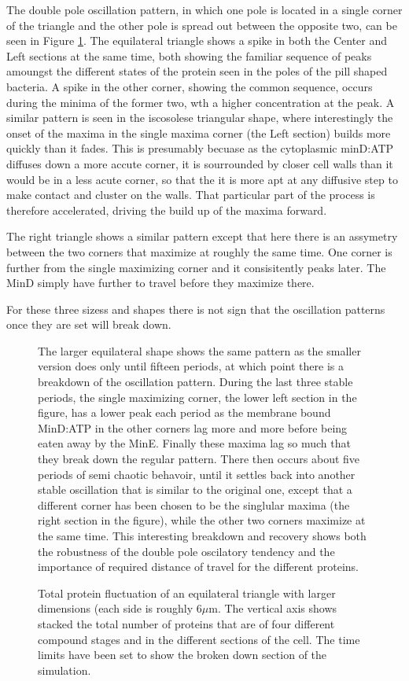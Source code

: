 \documentclass[letterpaper,twocolumn,amsmath,amssymb,pre]{revtex4-1}
\newcommand\micron{\ensuremath{\mu\text{m}}}
\begin{document}
The double pole oscillation pattern, in which one pole is located in a
single corner of the triangle and the other pole is spread out between
the opposite two, can be seen in Figure \ref{box-triangle}.  The
equilateral triangle shows a spike in both the Center and Left
sections at the same time, both showing the familiar sequence of peaks
amoungst the different states of the protein seen in the poles of the
pill shaped bacteria.  A spike in the other corner, showing the common
sequence, occurs during the minima of the former two, wth a higher
concentration at the peak.  A similar pattern is seen in the
iscosolese triangular shape, where interestingly the onset of the
maxima in the single maxima corner (the Left section) builds more
quickly than it fades.  This is presumably becuase as the cytoplasmic
minD:ATP diffuses down a more accute corner, it is sourrounded by
closer cell walls than it would be in a less acute corner, so that the
it is more apt at any diffusive step to make contact and cluster on
the walls.  That particular part of the process is therefore
accelerated, driving the build up of the maxima forward.

The right triangle shows a similar pattern except that here there is
an assymetry between the two corners that maximize at roughly the same
time.  One corner is further from the single maximizing corner and it
consisitently peaks later.  The MinD simply have further to travel
before they maximize there.

For these three sizess and shapes there is not sign that the
oscillation patterns once they are set will break down.

\begin{figure}
  \caption{Total protein fluctuation of an equilateral triangle with
    larger dimensions (each side is roughly $6\micron$.  The vertical
    axis shows stacked the total number of proteins that are of four
    different compound stages and in the different sections of the
    cell. The time limits have been set to show the broken down
    section of the simulation.}
  \label{box-triangle}

The larger equilateral shape shows the same pattern as the smaller
version does only until fifteen periods, at which point there is a
breakdown of the oscillation pattern.  During the last three stable
periods, the single maximizing corner, the lower left section in the
figure, has a lower peak each period as the membrane bound MinD:ATP in
the other corners lag more and more before being eaten away by the
MinE.  Finally these maxima lag so much that they break down the
regular pattern.  There then occurs about five periods of semi chaotic
behavoir, until it settles back into another stable oscillation that
is similar to the original one, except that a different corner has
been chosen to be the singlular maxima (the right section in the
figure), while the other two corners maximize at the same time.  This
interesting breakdown and recovery shows both the robustness of the
double pole oscilatory tendency and the importance of required
distance of travel for the different proteins.

\end{figure}
\end{document}
